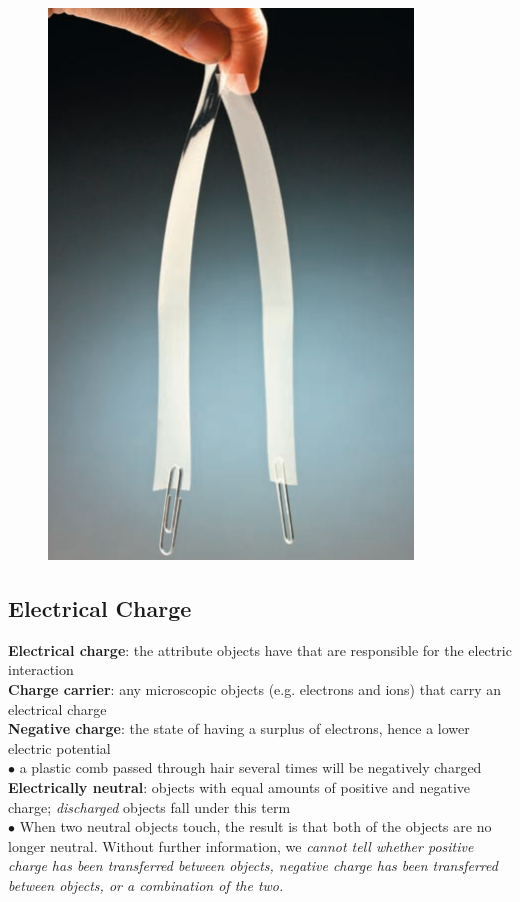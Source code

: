        \begin{figure}[hbt!]
            \centering
            \includegraphics[scale=0.75]{Resources/22.1_Tape}
        \end{figure}

    \subsection{Electrical Charge}      %

        \textbf{Electrical charge}: the attribute objects have that are responsible for the electric interaction \\
        \textbf{Charge carrier}: any microscopic objects (e.g. electrons and ions) that carry an electrical charge \\
        \textbf{Negative charge}: the state of having a surplus of electrons, hence a lower electric potential \\
        $\bullet$ a plastic comb passed through hair several times will be negatively charged
        \textbf{Electrically neutral}: objects with equal amounts of positive and negative charge; \textit{discharged} objects fall under this term \\
        $\bullet$ When two neutral objects touch, the result is that both of the objects are no longer neutral. Without further information, we \textit{cannot tell whether positive charge has been transferred between
        objects, negative charge has been transferred between objects, or a combination of the two.} \\

